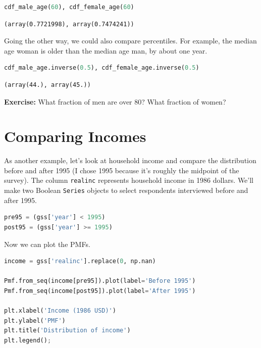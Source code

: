 \begin{lstlisting}[language=Python,style=source]
cdf_male_age(60), cdf_female_age(60)
\end{lstlisting}

\begin{lstlisting}[style=output]
(array(0.7721998), array(0.7474241))
\end{lstlisting}

Going the other way, we could also compare percentiles. For example, the
median age woman is older than the median age man, by about one year.

\begin{lstlisting}[language=Python,style=source]
cdf_male_age.inverse(0.5), cdf_female_age.inverse(0.5)
\end{lstlisting}

\begin{lstlisting}[style=output]
(array(44.), array(45.))
\end{lstlisting}

\textbf{Exercise:} What fraction of men are over 80? What fraction of
women?

\hypertarget{comparing-incomes}{%
\section{Comparing Incomes}\label{comparing-incomes}}

As another example, let's look at household income and compare the
distribution before and after 1995 (I chose 1995 because it's roughly
the midpoint of the survey). The column
\passthrough{\lstinline!realinc!} represents household income in 1986
dollars. We'll make two Boolean \passthrough{\lstinline!Series!} objects
to select respondents interviewed before and after 1995.

\begin{lstlisting}[language=Python,style=source]
pre95 = (gss['year'] < 1995)
post95 = (gss['year'] >= 1995)
\end{lstlisting}

Now we can plot the PMFs.

\begin{lstlisting}[language=Python,style=source]
income = gss['realinc'].replace(0, np.nan)

Pmf.from_seq(income[pre95]).plot(label='Before 1995')
Pmf.from_seq(income[post95]).plot(label='After 1995')

plt.xlabel('Income (1986 USD)')
plt.ylabel('PMF')
plt.title('Distribution of income')
plt.legend();
\end{lstlisting}

